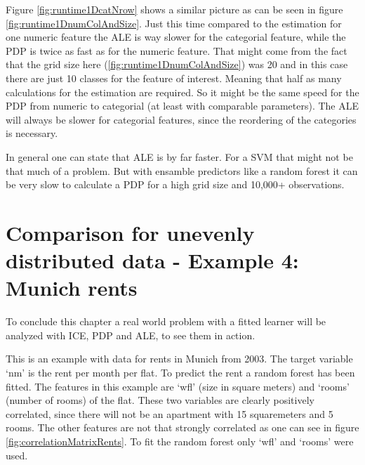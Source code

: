 \documentclass[
]{krantz}
\begin{document}
Figure \ref{fig:runtime1DcatNrow} shows a similar picture as can be seen in figure \ref{fig:runtime1DnumColAndSize}. Just this time compared to the estimation for one numeric feature the ALE is way slower for the categorial feature, while the PDP is twice as fast as for the numeric feature. That might come from the fact that the grid size here (\ref{fig:runtime1DnumColAndSize}) was 20 and in this case there are just 10 classes for the feature of interest. Meaning that half as many calculations for the estimation are required. So it might be the same speed for the PDP from numeric to categorial (at least with comparable parameters). The ALE will always be slower for categorial features, since the reordering of the categories is necessary.

In general one can state that ALE is by far faster. For a SVM that might not be that much of a problem. But with ensamble predictors like a random forest it can be very slow to calculate a PDP for a high grid size and 10,000+ observations.

\hypertarget{comparison-for-unevenly-distributed-data---example-4-munich-rents}{%
\section{Comparison for unevenly distributed data - Example 4: Munich rents}\label{comparison-for-unevenly-distributed-data---example-4-munich-rents}}

To conclude this chapter a real world problem with a fitted learner will be analyzed with ICE, PDP and ALE, to see them in action.

This is an example with data for rents in Munich from 2003. The target variable `nm' is the rent per month per flat. To predict the rent a random forest has been fitted. The features in this example are `wfl' (size in square meters) and `rooms' (number of rooms) of the flat. These two variables are clearly positively correlated, since there will not be an apartment with 15 squaremeters and 5 rooms. The other features are not that strongly correlated as one can see in figure \ref{fig:correlationMatrixRents}. To fit the random forest only `wfl' and `rooms' were used.
\end{document}
